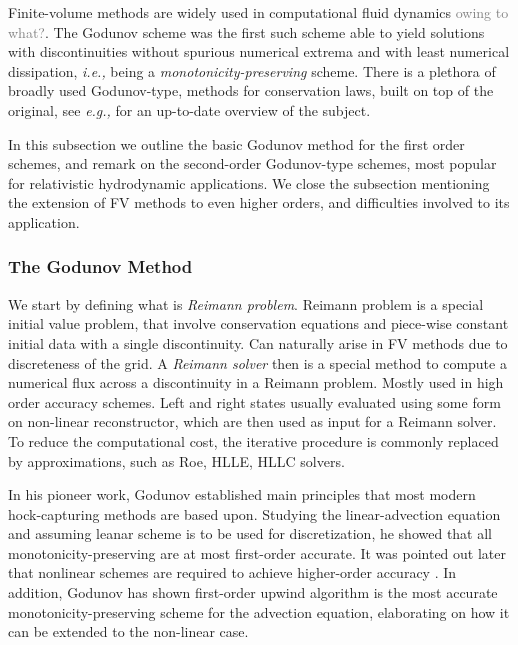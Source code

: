 \documentclass[11pt,a4paper,headinclude=true,DIV=14,BCOR=8mm,chapterprefix,listof=totoc,twoside,openright,abstracton]{scrbook}
\newcommand{\gray}[1]{\textcolor{gray}{#1}}
\begin{document}
Finite-volume methods are widely used in computational fluid dynamics \gray{owing to what?}. The Godunov scheme \cite{Godunov:1959} was the first such scheme able to yield solutions with discontinuities without spurious numerical extrema and with least numerical dissipation, \textit{i.e.,} being a \textit{monotonicity-preserving} scheme. There is a plethora of broadly used Godunov-type, methods for conservation laws, built on top of the original, see \textit{e.g.,} \cite{Toro:1999} for an up-to-date overview of the subject. 

In this subsection we outline the basic Godunov method for the first order schemes, and remark on the second-order Godunov-type schemes, most popular for relativistic hydrodynamic applications. We close the subsection mentioning the extension of FV methods to even higher orders, and difficulties involved to its application.


\subsubsection{The Godunov Method}

We start by defining what is \textit{Reimann problem}. Reimann problem is a special initial value problem, that involve conservation equations and piece-wise constant initial data with a single discontinuity. Can naturally arise in FV methods due to discreteness of the grid. A \textit{Reimann solver} then is a special method to compute a numerical flux across a discontinuity in a Reimann problem. Mostly used in high order accuracy schemes. Left and right states usually evaluated using some form on non-linear reconstructor, which are then used as input for a Reimann solver. To reduce the computational cost, the iterative procedure is commonly replaced by approximations, such as Roe, HLLE, HLLC solvers. 

In his pioneer work, Godunov \cite{Godunov:1959} established main principles that most modern hock-capturing methods are based upon. Studying the linear-advection equation and assuming leanar scheme is to be used for discretization, he showed that all monotonicity-preserving are at most first-order accurate. It was pointed out later that nonlinear schemes are required to achieve higher-order accuracy \cite{Boris:1971,vanLeer:1973}. In addition, Godunov has shown first-order upwind algorithm is the most accurate monotonicity-preserving scheme for the advection equation, elaborating on how it can be extended to the non-linear case. 
\end{document}

